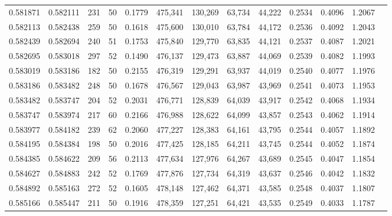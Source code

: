 \begin{tabular}{rrrrrrrrrrrrr}
0.581871 & 0.582111 &   231 &  50 &                                     0.1779 & 475,341 & 130,269 &  63,734 &  44,222 & 0.2534 & 0.4096 & 1.2067 \\
0.582113 & 0.582438 &   259 &  50 &                                     0.1618 & 475,600 & 130,010 &  63,784 &  44,172 & 0.2536 & 0.4092 & 1.2043 \\
0.582439 & 0.582694 &   240 &  51 &                                     0.1753 & 475,840 & 129,770 &  63,835 &  44,121 & 0.2537 & 0.4087 & 1.2021 \\
0.582695 & 0.583018 &   297 &  52 &                                     0.1490 & 476,137 & 129,473 &  63,887 &  44,069 & 0.2539 & 0.4082 & 1.1993 \\
0.583019 & 0.583186 &   182 &  50 &                                     0.2155 & 476,319 & 129,291 &  63,937 &  44,019 & 0.2540 & 0.4077 & 1.1976 \\
0.583186 & 0.583482 &   248 &  50 &                                     0.1678 & 476,567 & 129,043 &  63,987 &  43,969 & 0.2541 & 0.4073 & 1.1953 \\
0.583482 & 0.583747 &   204 &  52 &                                     0.2031 & 476,771 & 128,839 &  64,039 &  43,917 & 0.2542 & 0.4068 & 1.1934 \\
0.583747 & 0.583974 &   217 &  60 &                                     0.2166 & 476,988 & 128,622 &  64,099 &  43,857 & 0.2543 & 0.4062 & 1.1914 \\
0.583977 & 0.584182 &   239 &  62 &                                     0.2060 & 477,227 & 128,383 &  64,161 &  43,795 & 0.2544 & 0.4057 & 1.1892 \\
0.584195 & 0.584384 &   198 &  50 &                                     0.2016 & 477,425 & 128,185 &  64,211 &  43,745 & 0.2544 & 0.4052 & 1.1874 \\
0.584385 & 0.584622 &   209 &  56 &                                     0.2113 & 477,634 & 127,976 &  64,267 &  43,689 & 0.2545 & 0.4047 & 1.1854 \\
0.584627 & 0.584883 &   242 &  52 &                                     0.1769 & 477,876 & 127,734 &  64,319 &  43,637 & 0.2546 & 0.4042 & 1.1832 \\
0.584892 & 0.585163 &   272 &  52 &                                     0.1605 & 478,148 & 127,462 &  64,371 &  43,585 & 0.2548 & 0.4037 & 1.1807 \\
0.585166 & 0.585447 &   211 &  50 &                                     0.1916 & 478,359 & 127,251 &  64,421 &  43,535 & 0.2549 & 0.4033 & 1.1787 \\

\end{tabular}
